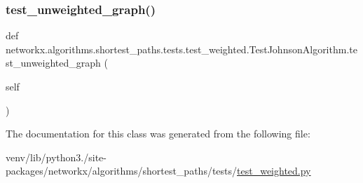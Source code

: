 \subsubsection{\texorpdfstring{test\+\_\+unweighted\+\_\+graph()}{test\_unweighted\_graph()}}
{\footnotesize\ttfamily def networkx.\+algorithms.\+shortest\+\_\+paths.\+tests.\+test\+\_\+weighted.\+Test\+Johnson\+Algorithm.\+test\+\_\+unweighted\+\_\+graph (\begin{DoxyParamCaption}\item[{}]{self }\end{DoxyParamCaption})}



The documentation for this class was generated from the following file\+:\begin{DoxyCompactItemize}
\item 
venv/lib/python3./site-\/packages/networkx/algorithms/shortest\+\_\+paths/tests/\hyperlink{test__weighted_8py}{test\+\_\+weighted.\+py}\end{DoxyCompactItemize}
